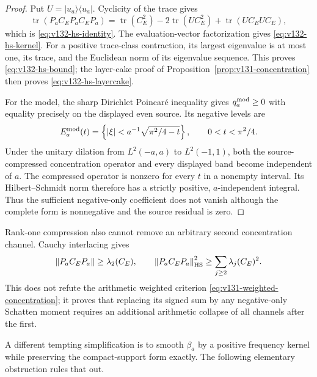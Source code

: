 \documentclass[11pt]{article}
\theoremstyle{remark}
\newcommand{\norm}[1]{\left\lVert #1\right\rVert}
\begin{document}
\begin{proof}
Put $U=|u_a\rangle\langle u_a|$. Cyclicity of the trace gives
\[
 \operatorname {tr}(P_aC_EP_aC_EP_a)
 =\operatorname {tr}(C_E^2)-2\operatorname {tr}(UC_E^2)
   +\operatorname {tr}(UC_EUC_E),
\]
which is \eqref{eq:v132-hs-identity}. The evaluation-vector
factorization gives \eqref{eq:v132-hs-kernel}. For a positive
trace-class contraction, its largest eigenvalue is at most one, its
trace, and the Euclidean norm of its eigenvalue sequence. This proves
\eqref{eq:v132-hs-bound}; the layer-cake proof of
Proposition~\ref{prop:v131-concentration} then proves
\eqref{eq:v132-hs-layercake}.

For the model, the sharp Dirichlet Poincar\'e inequality gives
$q_a^{\rm mod}\ge0$ with equality precisely on the displayed even
source. Its negative levels are
\[
 E_a^{\rm mod}(t)=\left\{|\xi|<a^{-1}
       \sqrt{\pi^2/4-t}\right\},
 \qquad 0<t<\pi^2/4.
\]
Under the unitary dilation from $L^2(-a,a)$ to $L^2(-1,1)$, both the
source-compressed concentration operator and every displayed band
become independent of $a$. The compressed operator is nonzero for
every $t$ in a nonempty interval. Its Hilbert--Schmidt norm therefore
has a strictly positive, $a$-independent integral. Thus the sufficient
negative-only coefficient does not vanish although the complete form
is nonnegative and the source residual is zero.
\end{proof}

Rank-one compression also cannot remove an arbitrary second
concentration channel. Cauchy interlacing gives
\begin{equation}\label{eq:v132-interlace}
 \norm{P_aC_EP_a}\ge\lambda_2(C_E),
 \qquad
 \norm{P_aC_EP_a}_{\rm HS}^2
     \ge\sum_{j\ge2}\lambda_j(C_E)^2.
\end{equation}
This does not refute the arithmetic weighted criterion
\eqref{eq:v131-weighted-concentration}; it proves that replacing its
signed sum by any negative-only Schatten moment requires an additional
arithmetic collapse of all channels after the first.

A different tempting simplification is to smooth $\beta_a$ by a
positive frequency kernel while preserving the compact-support form
exactly. The following elementary obstruction rules that out.
\end{document}
